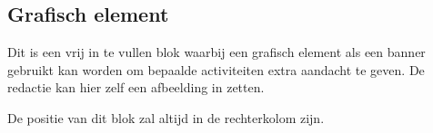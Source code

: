 \subsection{Grafisch element}
\label{sec:grafischelement}
Dit is een vrij in te vullen blok waarbij een grafisch element als een banner gebruikt kan worden om bepaalde activiteiten extra aandacht te geven. De redactie kan hier zelf een afbeelding in zetten.

De positie van dit blok zal altijd in de rechterkolom zijn.